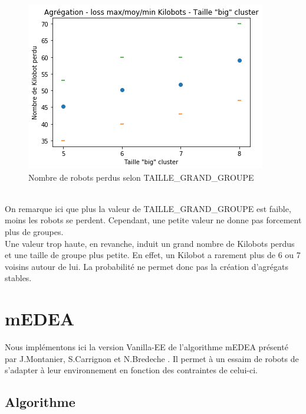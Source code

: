 \documentclass[a4paper]{article}
\begin{document}
\begin{figure}[h]
	\centering
	\begin{minipage}[c]{.46\linewidth}
		\centering
		\includegraphics[width=1.1\linewidth]{../../script_results/Agregation_loss_kilobot_big_cluster.png}
		\caption{Nombre de robots perdus selon TAILLE\_GRAND\_GROUPE}
	\end{minipage}
\end{figure}
\\On remarque ici que plus la valeur de TAILLE\_GRAND\_GROUPE est faible, moins les robots se perdent. Cependant, une petite valeur ne donne pas forcement plus de groupes.\\
Une valeur trop haute, en revanche, induit un grand nombre de Kilobots perdus et une taille de groupe plus petite. En effet, un Kilobot a rarement plus de 6 ou 7 voisins autour de lui. La probabilité ne permet donc pas la création d'agrégats stables.
\newpage
\section{mEDEA}
Nous implémentons ici la version Vanilla-EE de l'algorithme mEDEA présenté par J.Montanier, S.Carrignon et N.Bredeche \cite{montanier_behavioral_2016}. Il permet à un essaim de robots de s'adapter à leur environnement en fonction des contraintes de celui-ci.
\subsection{Algorithme}
\end{document}
